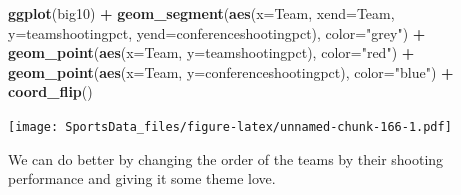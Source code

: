 \documentclass[]{book}
\newenvironment{Shaded}{\begin{snugshade}}{\end{snugshade}}
\newcommand{\DataTypeTok}[1]{\textcolor[rgb]{0.13,0.29,0.53}{#1}}
\newcommand{\KeywordTok}[1]{\textcolor[rgb]{0.13,0.29,0.53}{\textbf{#1}}}
\newcommand{\NormalTok}[1]{#1}
\newcommand{\OperatorTok}[1]{\textcolor[rgb]{0.81,0.36,0.00}{\textbf{#1}}}
\newcommand{\StringTok}[1]{\textcolor[rgb]{0.31,0.60,0.02}{#1}}
\begin{document}
\begin{Shaded}
\begin{Highlighting}[]
\KeywordTok{ggplot}\NormalTok{(big10) }\OperatorTok{+}
\StringTok{  }\KeywordTok{geom_segment}\NormalTok{(}\KeywordTok{aes}\NormalTok{(}\DataTypeTok{x=}\NormalTok{Team, }\DataTypeTok{xend=}\NormalTok{Team, }\DataTypeTok{y=}\NormalTok{teamshootingpct, }\DataTypeTok{yend=}\NormalTok{conferenceshootingpct), }\DataTypeTok{color=}\StringTok{"grey"}\NormalTok{) }\OperatorTok{+}\StringTok{ }
\StringTok{  }\KeywordTok{geom_point}\NormalTok{(}\KeywordTok{aes}\NormalTok{(}\DataTypeTok{x=}\NormalTok{Team, }\DataTypeTok{y=}\NormalTok{teamshootingpct), }\DataTypeTok{color=}\StringTok{"red"}\NormalTok{) }\OperatorTok{+}\StringTok{ }
\StringTok{  }\KeywordTok{geom_point}\NormalTok{(}\KeywordTok{aes}\NormalTok{(}\DataTypeTok{x=}\NormalTok{Team, }\DataTypeTok{y=}\NormalTok{conferenceshootingpct), }\DataTypeTok{color=}\StringTok{"blue"}\NormalTok{) }\OperatorTok{+}
\StringTok{  }\KeywordTok{coord_flip}\NormalTok{()}
\end{Highlighting}
\end{Shaded}

\texttt{[image: SportsData\_files/figure-latex/unnamed-chunk-166-1.pdf]}

We can do better by changing the order of the teams by their shooting performance and giving it some theme love.
\end{document}
